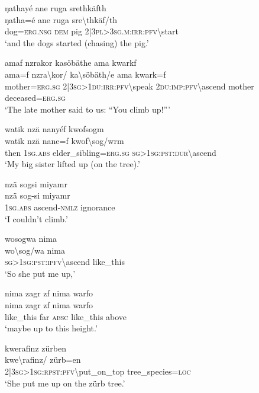 \ea\label{ex:14:a2949}
ŋathayé ane ruga srethkäfth\\
\gll ŋatha=é	ane	ruga	sre{\textbackslash}thkäf/th\\
     dog=\textsc{erg}.\textsc{nsg}	\textsc{dem}	pig	2|3\textsc{pl}>3\textsc{sg}.\textsc{m}:\textsc{irr}:\textsc{pfv}{\textbackslash}start\\
\glt `and the dogs started (chasing) the pig.'
\z

\ea\label{ex:14:a2950}
amaf nzrakor kasöbäthe ama kwarkf\\
\gll ama=f	nzra{\textbackslash}kor/	ka{\textbackslash}söbäth/e	ama	kwark=f\\
     mother=\textsc{erg}.\textsc{sg}	2|3\textsc{sg}>1\textsc{du}:\textsc{irr}:\textsc{pfv}{\textbackslash}speak	2\textsc{du}:\textsc{imp}:\textsc{pfv}{\textbackslash}ascend	mother	deceased=\textsc{erg}.\textsc{sg}\\
\glt `The late mother said to us: ``You climb up!'''
\z

\ea\label{ex:14:a2953}
watik nzä nanyéf kwofsogm\\
\gll watik	nzä	nane=f	kwof{\textbackslash}sog/wrm\\
     then	1\textsc{sg}.\textsc{abs}	elder\_sibling=\textsc{erg}.\textsc{sg}	\textsc{sg}>1\textsc{sg}:\textsc{pst}:\textsc{dur}{\textbackslash}ascend\\
\glt `My big sister lifted up (on the tree).'
\z

\ea\label{ex:14:a2954}
nzä sogsi miyamr\\
\gll nzä	sog-si	miyamr\\
     1\textsc{sg}.\textsc{abs}	ascend-\textsc{nmlz}	ignorance\\
\glt `I couldn't climb.'
\z

\ea\label{ex:14:a2955}
wosogwa nima\\
\gll wo{\textbackslash}sog/wa	nima\\
     \textsc{sg}>1\textsc{sg}:\textsc{pst}:\textsc{ipfv}{\textbackslash}ascend	like\_this\\
\glt `So she put me up,'
\z

\ea\label{ex:14:a2956}
nima zagr zf nima warfo\\
\gll nima	zagr	zf	nima	warfo\\
     like\_this	far	\textsc{absc}	like\_this	above\\
\glt `maybe up to this height.'
\z

\ea\label{ex:14:a2957}
kwerafinz zürben\\
\gll kwe{\textbackslash}rafinz/	zürb=en\\
     2|3\textsc{sg}>1\textsc{sg}:\textsc{rpst}:\textsc{pfv}{\textbackslash}put\_on\_top	tree\_species=\textsc{loc}\\
\glt `She put me up on the zürb tree.'
\z

